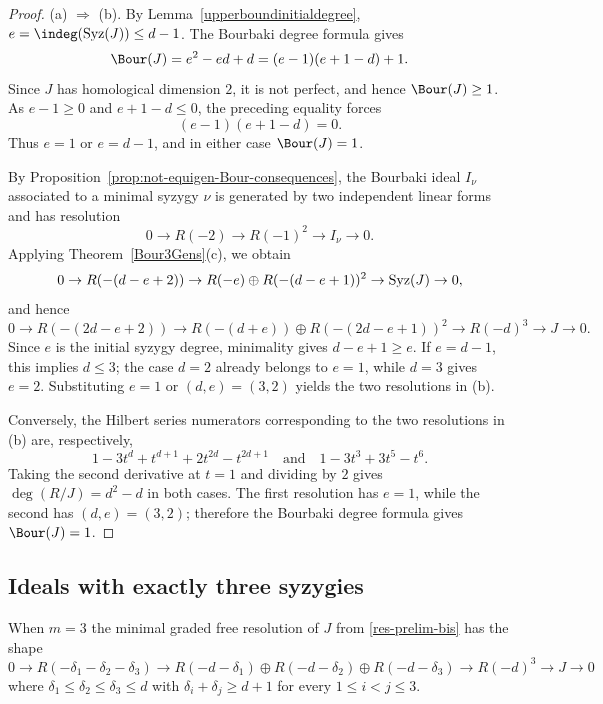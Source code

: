 \documentclass[11pt]{amsart} %
\theoremstyle{definition}
\def\syz{\mbox{\rm Syz}}
\begin{document}
\begin{proof}
{\rm(a)} $\Rightarrow$ {\rm(b)}. By Lemma~\ref{upperboundinitialdegree},
$e=\indeg(\syz(J))\le d-1$. The Bourbaki degree formula gives
\[
\Bour(J)=e^2-ed+d=(e-1)(e+1-d)+1.
\]
Since $J$ has homological dimension $2$, it is not perfect, and hence
$\Bour(J)\ge1$. As $e-1\ge0$ and $e+1-d\le0$, the preceding equality
forces
\[
(e-1)(e+1-d)=0.
\]
Thus $e=1$ or $e=d-1$, and in either case $\Bour(J)=1$.

By Proposition~\ref{prop:not-equigen-Bour-consequences}, the Bourbaki
ideal $I_\nu$ associated to a minimal syzygy $\nu$ is generated by two
independent linear forms and has resolution
\[
0\to R(-2)\to R(-1)^2\to I_\nu\to0.
\]
Applying Theorem~\ref{Bour3Gens}{\rm(c)}, we obtain
\[
0\to R(-(d-e+2))
\to R(-e)\oplus R(-(d-e+1))^2
\to\syz(J)\to0,
\]
and hence
\[
0\to R(-(2d-e+2))
\to R(-(d+e))\oplus R(-(2d-e+1))^2
\to R(-d)^3\to J\to0.
\]
Since $e$ is the initial syzygy degree, minimality gives
$d-e+1\ge e$. If $e=d-1$, this implies $d\le3$; the case $d=2$ already
belongs to $e=1$, while $d=3$ gives $e=2$. Substituting $e=1$ or
$(d,e)=(3,2)$ yields the two resolutions in {\rm(b)}.

Conversely, the Hilbert series numerators corresponding to the two
resolutions in {\rm(b)} are, respectively,
\[
1-3t^d+t^{d+1}+2t^{2d}-t^{2d+1}
\quad\text{and}\quad
1-3t^3+3t^5-t^6.
\]
Taking the second derivative at $t=1$ and dividing by $2$ gives
$\deg(R/J)=d^2-d$ in both cases. The first resolution has $e=1$, while
the second has $(d,e)=(3,2)$; therefore the Bourbaki degree formula
gives $\Bour(J)=1$.
\end{proof}



	
\subsection{Ideals with exactly three syzygies}

When $m=3$ the minimal graded free resolution of $J$ from \eqref{res-prelim-bis} has the shape
\begin{equation}\label{resm=3}
0\to R(-\delta_1-\delta_2-\delta_3)\to R(-d-\delta_1)\oplus R(-d-\delta_2)\oplus R(-d-\delta_3) \to R(-d)^3\to J \to 0
\end{equation}
where $\delta_1\leq \delta_2\leq \delta_3\leq d$ with $\delta_i+\delta_j\geq d+1$ for every $1\leq i<j\leq 3$.
\end{document}
